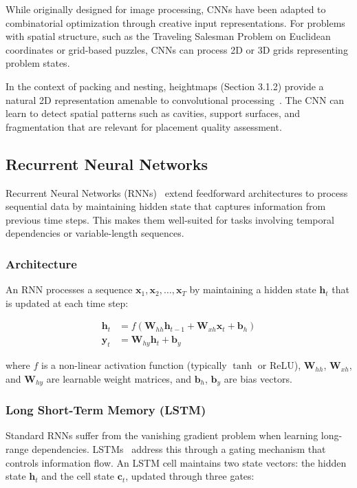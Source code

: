 While originally designed for image processing, CNNs have been adapted to combinatorial optimization through creative input representations. For problems with spatial structure, such as the Traveling Salesman Problem on Euclidean coordinates or grid-based puzzles, CNNs can process 2D or 3D grids representing problem states.

In the context of packing and nesting, heightmaps (Section 3.1.2) provide a natural 2D representation amenable to convolutional processing~\cite{cnn_heightmap2024}. The CNN can learn to detect spatial patterns such as cavities, support surfaces, and fragmentation that are relevant for placement quality assessment.

\subsection{Recurrent Neural Networks}

Recurrent Neural Networks (RNNs)~\cite{elman1990finding} extend feedforward architectures to process sequential data by maintaining hidden state that captures information from previous time steps. This makes them well-suited for tasks involving temporal dependencies or variable-length sequences.

\subsubsection{Architecture}

An RNN processes a sequence $\mathbf{x}_1, \mathbf{x}_2, \ldots, \mathbf{x}_T$ by maintaining a hidden state $\mathbf{h}_t$ that is updated at each time step:

\begin{align}
\mathbf{h}_t &= f(\mathbf{W}_{hh} \mathbf{h}_{t-1} + \mathbf{W}_{xh} \mathbf{x}_t + \mathbf{b}_h) \\
\mathbf{y}_t &= \mathbf{W}_{hy} \mathbf{h}_t + \mathbf{b}_y
\end{align}

where $f$ is a non-linear activation function (typically $\tanh$ or ReLU), $\mathbf{W}_{hh}$, $\mathbf{W}_{xh}$, and $\mathbf{W}_{hy}$ are learnable weight matrices, and $\mathbf{b}_h$, $\mathbf{b}_y$ are bias vectors.

\subsubsection{Long Short-Term Memory (LSTM)}

Standard RNNs suffer from the vanishing gradient problem when learning long-range dependencies. LSTMs~\cite{hochreiter1997long} address this through a gating mechanism that controls information flow. An LSTM cell maintains two state vectors: the hidden state $\mathbf{h}_t$ and the cell state $\mathbf{c}_t$, updated through three gates:

